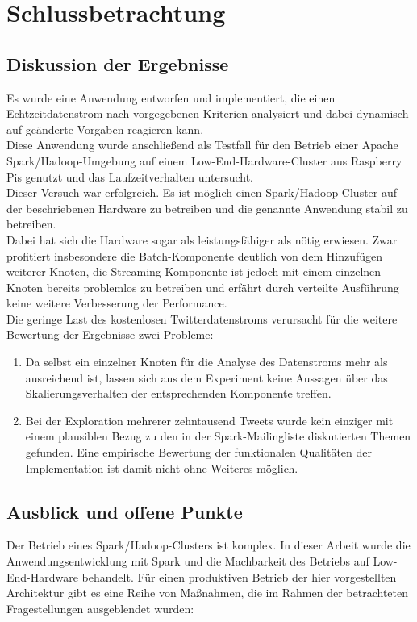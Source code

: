 \chapter{Schlussbetrachtung}
\section{Diskussion der Ergebnisse}
Es wurde eine Anwendung entworfen und implementiert, die einen Echtzeitdatenstrom nach vorgegebenen Kriterien analysiert und dabei dynamisch auf geänderte Vorgaben reagieren kann.\\
Diese Anwendung wurde anschließend als Testfall für den Betrieb einer Apache Spark/Hadoop-Umgebung auf einem Low-End-Hardware-Cluster aus Raspberry Pis genutzt und das Laufzeitverhalten untersucht.\\

Dieser Versuch war erfolgreich. Es ist möglich einen Spark/Hadoop-Cluster auf der beschriebenen Hardware zu betreiben und die genannte Anwendung stabil zu betreiben.\\

Dabei hat sich die Hardware sogar als leistungsfähiger als nötig erwiesen. Zwar profitiert insbesondere die Batch-Komponente deutlich von dem Hinzufügen weiterer Knoten, die Streaming-Komponente ist jedoch mit einem einzelnen Knoten bereits problemlos zu betreiben und erfährt durch verteilte Ausführung keine weitere Verbesserung der Performance.\\

Die geringe Last des kostenlosen Twitterdatenstroms verursacht für die weitere Bewertung der Ergebnisse zwei Probleme:
\begin{enumerate}
	\item Da selbst ein einzelner Knoten für die Analyse des Datenstroms mehr als ausreichend ist, lassen sich aus dem Experiment keine Aussagen über das Skalierungsverhalten der entsprechenden Komponente treffen.
	\item Bei der Exploration mehrerer zehntausend Tweets wurde kein einziger mit einem plausiblen Bezug zu den in der Spark-Mailingliste diskutierten Themen gefunden. Eine empirische Bewertung der funktionalen Qualitäten der Implementation ist damit nicht ohne Weiteres möglich.
\end{enumerate}

\section{Ausblick und offene Punkte}
Der Betrieb eines Spark/Hadoop-Clusters ist komplex. In dieser Arbeit wurde die Anwendungsentwicklung mit Spark und die Machbarkeit des Betriebs auf Low-End-Hardware behandelt. Für einen produktiven Betrieb der hier vorgestellten Architektur gibt es eine Reihe von Maßnahmen, die im Rahmen der betrachteten Fragestellungen ausgeblendet wurden:\\

